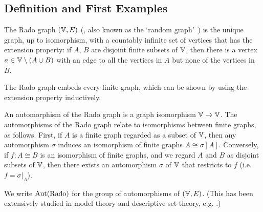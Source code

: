 \subsection{Definition and First Examples}\label{sec:rado-def}
The Rado graph $(\mathbb{V},E)$ (\hspace{1sp}\cite{ackermannWiderspruchsfreiheitAllgemeinenMengenlehre1937,radoUniversalGraphsUniversal1964}, also known as the `random graph'~\cite{erdosRandomGraphs1959}) is the unique graph, up to isomorphism, with a countably infinite set of vertices
that has the extension property:
if $A$, $B$ are disjoint finite subsets of $\mathbb{V}$, then there is a
vertex $a \in \mathbb{V} \setminus (A \cup B)$ with an edge to all the vertices in $A$ but none of the
vertices in $B$.

The Rado graph embeds every finite graph, which can be shown by using
the extension property inductively.

An automorphism of the Rado graph is a graph isomorphism $\mathbb{V}\to
\mathbb{V}$. 
The automorphisms of the Rado graph relate to isomorphisms between
finite graphs, as follows. First, if $A$ is a finite graph regarded as
a subset of $\mathbb{V}$, then any automorphism $\sigma$ induces an
isomorphism of finite graphs $A\cong \sigma[A]$. Conversely,
if $f\colon A\cong B$ is an isomorphism of finite graphs, and we regard $A$
and $B$ as disjoint subsets of $\mathbb{V}$, then there exists an
automorphism $\sigma$ of $\mathbb{V}$ that restricts to $f$ (i.e.\ $f=\sigma|_A$).

We write $\operatorname{Aut}(\mathrm{Rado})$ for the group of automorphisms of $(\mathbb{V},E)$. 
(This has been extensively studied in model theory and descriptive set theory, e.g. \cite{MR2140630,MR3274785}.)

